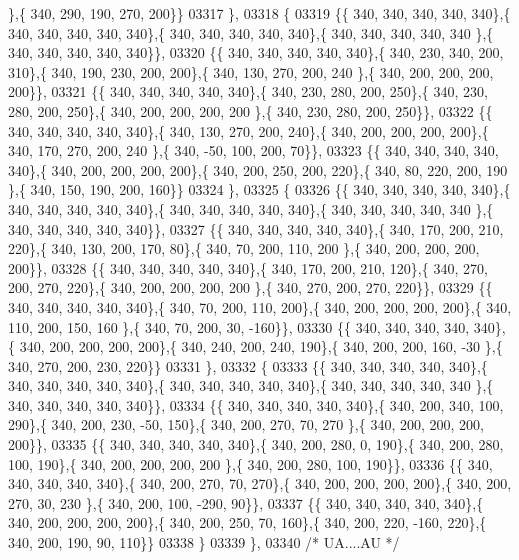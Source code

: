 \begin{DoxyCode}
      \},\{ 340, 290, 190, 270, 200\}\}
03317 \},
03318 \{
03319 \{\{ 340, 340, 340, 340, 340\},\{ 340, 340, 340, 340, 340\},\{ 340, 340, 340, 340, 340\},\{ 340, 340, 340, 340, 340
      \},\{ 340, 340, 340, 340, 340\}\},
03320 \{\{ 340, 340, 340, 340, 340\},\{ 340, 230, 340, 200, 310\},\{ 340, 190, 230, 200, 200\},\{ 340, 130, 270, 200, 240
      \},\{ 340, 200, 200, 200, 200\}\},
03321 \{\{ 340, 340, 340, 340, 340\},\{ 340, 230, 280, 200, 250\},\{ 340, 230, 280, 200, 250\},\{ 340, 200, 200, 200, 200
      \},\{ 340, 230, 280, 200, 250\}\},
03322 \{\{ 340, 340, 340, 340, 340\},\{ 340, 130, 270, 200, 240\},\{ 340, 200, 200, 200, 200\},\{ 340, 170, 270, 200, 240
      \},\{ 340, -50, 100, 200,  70\}\},
03323 \{\{ 340, 340, 340, 340, 340\},\{ 340, 200, 200, 200, 200\},\{ 340, 200, 250, 200, 220\},\{ 340,  80, 220, 200, 190
      \},\{ 340, 150, 190, 200, 160\}\}
03324 \},
03325 \{
03326 \{\{ 340, 340, 340, 340, 340\},\{ 340, 340, 340, 340, 340\},\{ 340, 340, 340, 340, 340\},\{ 340, 340, 340, 340, 340
      \},\{ 340, 340, 340, 340, 340\}\},
03327 \{\{ 340, 340, 340, 340, 340\},\{ 340, 170, 200, 210, 220\},\{ 340, 130, 200, 170,  80\},\{ 340,  70, 200, 110, 200
      \},\{ 340, 200, 200, 200, 200\}\},
03328 \{\{ 340, 340, 340, 340, 340\},\{ 340, 170, 200, 210, 120\},\{ 340, 270, 200, 270, 220\},\{ 340, 200, 200, 200, 200
      \},\{ 340, 270, 200, 270, 220\}\},
03329 \{\{ 340, 340, 340, 340, 340\},\{ 340,  70, 200, 110, 200\},\{ 340, 200, 200, 200, 200\},\{ 340, 110, 200, 150, 160
      \},\{ 340,  70, 200,  30, -160\}\},
03330 \{\{ 340, 340, 340, 340, 340\},\{ 340, 200, 200, 200, 200\},\{ 340, 240, 200, 240, 190\},\{ 340, 200, 200, 160, -30
      \},\{ 340, 270, 200, 230, 220\}\}
03331 \},
03332 \{
03333 \{\{ 340, 340, 340, 340, 340\},\{ 340, 340, 340, 340, 340\},\{ 340, 340, 340, 340, 340\},\{ 340, 340, 340, 340, 340
      \},\{ 340, 340, 340, 340, 340\}\},
03334 \{\{ 340, 340, 340, 340, 340\},\{ 340, 200, 340, 100, 290\},\{ 340, 200, 230, -50, 150\},\{ 340, 200, 270,  70, 270
      \},\{ 340, 200, 200, 200, 200\}\},
03335 \{\{ 340, 340, 340, 340, 340\},\{ 340, 200, 280,   0, 190\},\{ 340, 200, 280, 100, 190\},\{ 340, 200, 200, 200, 200
      \},\{ 340, 200, 280, 100, 190\}\},
03336 \{\{ 340, 340, 340, 340, 340\},\{ 340, 200, 270,  70, 270\},\{ 340, 200, 200, 200, 200\},\{ 340, 200, 270,  30, 230
      \},\{ 340, 200, 100, -290,  90\}\},
03337 \{\{ 340, 340, 340, 340, 340\},\{ 340, 200, 200, 200, 200\},\{ 340, 200, 250,  70, 160\},\{ 340, 200, 220, -160, 
      220\},\{ 340, 200, 190,  90, 110\}\}
03338 \}
03339 \},
03340 \textcolor{comment}{/* UA....AU */}

\end{DoxyCode}
